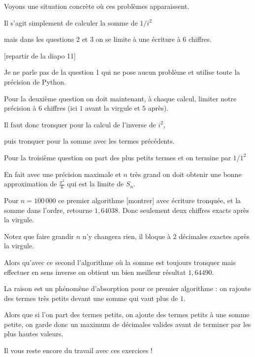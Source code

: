 \diapo

Voyons une situation concrète où ces problèmes apparaissent.

Il s'agit simplement de calculer la somme de $1/i^2$

mais dans les questions 2 et 3 on se limite à une écriture à $6$
chiffres.




\diapo

[repartir de la diapo 11]

Je ne parle pas de la question 1 qui
ne pose aucun problème et utilise toute la précision de Python.

\change

Pour la deuxième question on doit maintenant, à chaque calcul, 
limiter notre précision à $6$ chiffres 
(ici $1$ avant la virgule et $5$ après).

Il faut donc tronquer pour la calcul de l'inverse de $i^2$,

puis tronquer pour la somme avec les termes précédents.


\change

Pour la troisième question on part des plus petits termes
et on termine par $1/1^2$


\change

En fait avec une précision maximale et $n$ très grand 
on doit obtenir une bonne approximation de $\frac{\pi^2}{6}$ 
qui est la limite de $S_n$.

\change

Pour  $n = 100\, 000$ ce premier algorithme [montrer] avec écriture tronquée,
et la somme dans l'ordre, retourne $1,64038$. Donc seulement deux chiffres exacts 
après la virgule.

Notez que faire grandir $n$ n'y changera rien, il bloque à $2$ décimales exactes 
après la virgule.

\change

Alors qu'avec ce second l'algorithme où la somme est toujours tronquer
mais effectuer en sens inverse on obtient un bien meilleur résultat 
$1,64490$. 

La raison est un phénomène d’absorption pour ce premier algorithme : 
on rajoute des termes très petits devant une somme qui vaut plus de $1$.


Alors que si l'on part des termes petits, on ajoute des termes petits 
à une somme petite, on garde donc un maximum 
de décimales valides avant de terminer par les plus hautes valeurs.


\diapo

Il vous reste encore du travail avec ces exercices !



